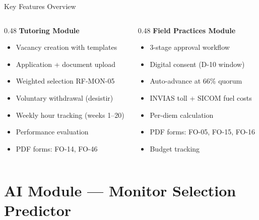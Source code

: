 \documentclass[aspectratio=169,12pt]{beamer}
\begin{document}
\begin{frame}{Key Features Overview}
  \begin{columns}[T]
    \begin{column}{0.48\textwidth}
      \textbf{\color{vinotinto}Tutoring Module}
      \begin{itemize}\footnotesize
        \item Vacancy creation with templates
        \item Application + document upload
        \item Weighted selection RF-MON-05
        \item Voluntary withdrawal (desistir)
        \item Weekly hour tracking (weeks 1–20)
        \item Performance evaluation
        \item PDF forms: FO-14, FO-46
      \end{itemize}
    \end{column}
    \begin{column}{0.48\textwidth}
      \textbf{\color{vinotinto}Field Practices Module}
      \begin{itemize}\footnotesize
        \item 3-stage approval workflow
        \item Digital consent (D-10 window)
        \item Auto-advance at 66\% quorum
        \item INVIAS toll + SICOM fuel costs
        \item Per-diem calculation
        \item PDF forms: FO-05, FO-15, FO-16
        \item Budget tracking
      \end{itemize}
    \end{column}
  \end{columns}
\end{frame}

\section{AI Module — Monitor Selection Predictor}
\end{document}
